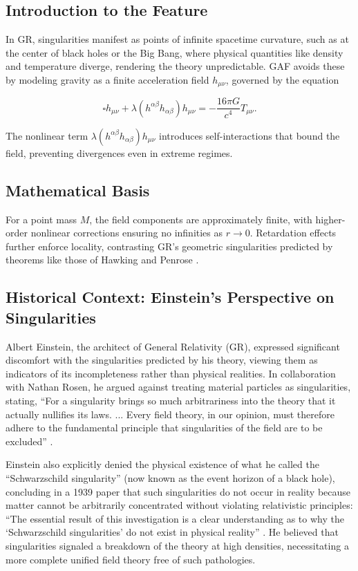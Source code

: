 \documentclass{article}
\begin{document}
\subsection{Introduction to the Feature}

In GR, singularities manifest as points of infinite spacetime curvature, such as at the center of black holes or the Big Bang, where physical quantities like density and temperature diverge, rendering the theory unpredictable. GAF avoids these by modeling gravity as a finite acceleration field \( h_{\mu\nu} \), governed by the equation

\[
\square h_{\mu\nu} + \lambda (h^{\alpha\beta} h_{\alpha\beta}) h_{\mu\nu} = -\frac{16\pi G}{c^4} T_{\mu\nu}.
\]

The nonlinear term \( \lambda (h^{\alpha\beta} h_{\alpha\beta}) h_{\mu\nu} \) introduces self-interactions that bound the field, preventing divergences even in extreme regimes.

\subsection{Mathematical Basis}

For a point mass \( M \), the field components are approximately finite, with higher-order nonlinear corrections ensuring no infinities as \( r \to 0 \). Retardation effects further enforce locality, contrasting GR's geometric singularities predicted by theorems like those of Hawking and Penrose \cite{Penrose1965}\cite{HawkingPenrose1970}.

\subsection{Historical Context: Einstein's Perspective on Singularities}

Albert Einstein, the architect of General Relativity (GR), expressed significant discomfort with the singularities predicted by his theory, viewing them as indicators of its incompleteness rather than physical realities. In collaboration with Nathan Rosen, he argued against treating material particles as singularities, stating, ``For a singularity brings so much arbitrariness into the theory that it actually nullifies its laws. ... Every field theory, in our opinion, must therefore adhere to the fundamental principle that singularities of the field are to be excluded'' \cite{EinsteinRosen1935}.

Einstein also explicitly denied the physical existence of what he called the ``Schwarzschild singularity'' (now known as the event horizon of a black hole), concluding in a 1939 paper that such singularities do not occur in reality because matter cannot be arbitrarily concentrated without violating relativistic principles: ``The essential result of this investigation is a clear understanding as to why the `Schwarzschild singularities' do not exist in physical reality'' \cite{Einstein1939}. He believed that singularities signaled a breakdown of the theory at high densities, necessitating a more complete unified field theory free of such pathologies.
\end{document}
